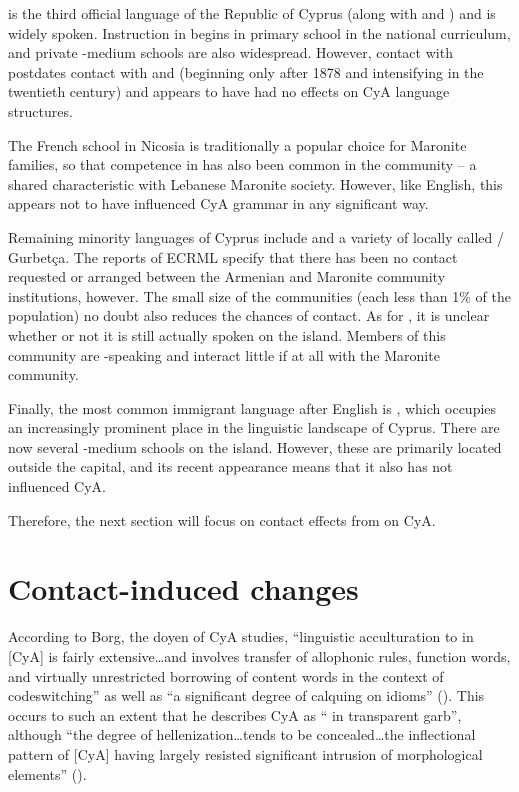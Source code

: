 \documentclass[output=paper]{langsci/langscibook}
\begin{document}
 is the third official language of the Republic of {Cyprus} (along with  and ) and is widely spoken. Instruction in  begins in primary school in the national curriculum, and private -medium schools are also widespread. However, contact with  postdates contact with  and  (beginning only after 1878 and intensifying in the twentieth century) and appears to have had no effects on CyA language structures.

The French school in Nicosia is traditionally a popular choice for Maronite families, so that competence in  has also been common in the community – a shared characteristic with Lebanese Maronite society. However, like English, this appears not to have influenced CyA grammar in any significant way.

Remaining minority languages of {Cyprus} include  and a variety of  locally called / Gurbetça. The reports of ECRML specify that there has been no contact requested or arranged between the Armenian and Maronite community institutions, however. The small size of the communities (each less than 1\% of the population) no doubt also reduces the chances of contact. As for , it is unclear whether or not it is still actually spoken on the island. Members of this community are -speaking and interact little if at all with the Maronite community.

Finally, the most common immigrant language after English is , which occupies an increasingly prominent place in the linguistic landscape of {Cyprus}. There are now several -medium schools on the island. However, these are primarily located outside the capital, and its recent appearance means that it also has not influenced CyA.


Therefore, the next section will focus on contact effects from  on CyA.

\section{Contact-induced changes}
According to Borg, the doyen of CyA studies, “linguistic acculturation to  in [CyA] is fairly extensive…and involves {transfer} of allophonic rules, function words, and virtually unrestricted borrowing of content words in the context of {codeswitching}” as well as “a significant degree of {calquing} on  {idioms}” (\citeyear[64]{Borg2004}). This occurs to such an extent that he describes CyA as “ in transparent  garb”, although “the degree of hellenization…tends to be concealed…the {inflectional} pattern of [CyA] having largely resisted significant intrusion of  morphological elements” (\citeyear[65]{Borg2004}).
\end{document}
